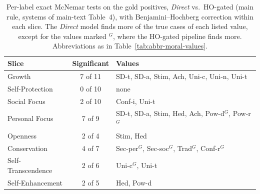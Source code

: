 \begin{table}[!htbp]
\centering
\footnotesize
\caption{Per-label exact McNemar tests on the gold positives, \emph{Direct} vs.\ HO-gated (main rule, systems of main-text Table~4), with Benjamini--Hochberg correction within each slice. The \emph{Direct} model finds more of the true cases of each listed value, except for the values marked $^{G}$, where the HO-gated pipeline finds more. Abbreviations as in Table~\ref{tab:abbr-moral-values}.}
\label{tab:s8-mcnemar}
\begin{tabularx}{\textwidth}{lcX}
\hline
\textbf{Slice} & \textbf{Significant} & \textbf{Values} \\
\hline
Growth & 7 of 11 & SD-t, SD-a, Stim, Ach, Uni-c, Uni-n, Uni-t \\
Self-Protection & 0 of 10 & none \\
Social Focus & 2 of 10 & Conf-i, Uni-t \\
Personal Focus & 7 of 9 & SD-t, SD-a, Stim, Hed, Ach, Pow-d$^{G}$, Pow-r$^{G}$ \\
Openness & 2 of 4 & Stim, Hed \\
Conservation & 4 of 7 & Sec-per$^{G}$, Sec-soc$^{G}$, Trad$^{G}$, Conf-r$^{G}$ \\
Self-Transcendence & 2 of 6 & Uni-c$^{G}$, Uni-t \\
Self-Enhancement & 2 of 5 & Hed, Pow-d \\
\hline
\end{tabularx}
\end{table}

